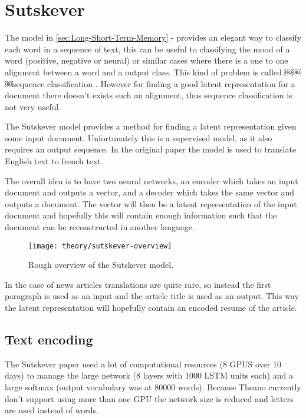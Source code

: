 
\section{Sutskever}

The model in \autoref{sec:Long-Short-Term-Memory} -  provides an elegant way to classify each word in a sequence of text, this can be useful to classifying the mood of a word (positive, negative or neural) or similar cases where there is a one to one alignment between a word and a output class. This kind of problem is called ￼￼￼sequence classification \cite[p.~10]{alexgraves}. However for finding a good latent representation for a document there doesn't exists such an alignment, thus sequence classification is not very useful.

The Sutskever model provides a method for finding a latent representation given some input document. Unfortunately this is a supervised model, as it also requires an output sequence. In the original paper \cite{sutskever} the model is used to translate English text to french text.

The overall idea is to have two neural networks, an encoder which takes an input document and outputs a vector, and a decoder which takes the same vector and outputs a document. The vector will then be a latent representation of the input document and hopefully this will contain enough information such that the document can be reconstructed in another language.

\begin{figure}[H]
	\centering
	\texttt{[image: theory/sutskever-overview]}
	\caption{Rough overview of the Sutskever model.}
\end{figure}

In the case of news articles translations are quite rare, so instead the first paragraph is used as an input and the article title is used as an output. This way the latent representation will hopefully contain an encoded resume of the article.

\subsection{Text encoding}

The Sutskever paper \cite{sutskever} used a lot of computational resources (8 GPUS over 10 days) to manage the large network (8 layers with $1000$ LSTM units each) and a large softmax (output vocabulary was at 80000 words). Because Theano currently don't support using more than one GPU the network size is reduced and letters are used instead of words.

